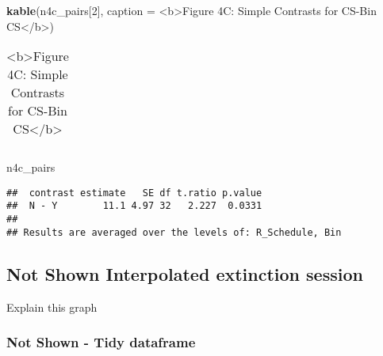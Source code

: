 \documentclass[
]{article}
\newenvironment{Shaded}{\begin{snugshade}}{\end{snugshade}}
\newcommand{\AttributeTok}[1]{\textcolor[rgb]{0.13,0.29,0.53}{#1}}
\newcommand{\DecValTok}[1]{\textcolor[rgb]{0.00,0.00,0.81}{#1}}
\newcommand{\FunctionTok}[1]{\textcolor[rgb]{0.13,0.29,0.53}{\textbf{#1}}}
\newcommand{\NormalTok}[1]{#1}
\newcommand{\StringTok}[1]{\textcolor[rgb]{0.31,0.60,0.02}{#1}}
\begin{document}
\begin{Shaded}
\begin{Highlighting}[]
\FunctionTok{kable}\NormalTok{(n4c\_pairs[}\DecValTok{2}\NormalTok{], }\AttributeTok{caption =} \StringTok{\textquotesingle{}\textless{}b\textgreater{}Figure 4C: Simple Contrasts for CS{-}Bin CS\textless{}/b\textgreater{}\textquotesingle{}}\NormalTok{)}
\end{Highlighting}
\end{Shaded}

\begin{table}
\caption{\label{tab:unnamed-chunk-8}<b>Figure 4C: Simple Contrasts for CS-Bin CS</b>}

\centering
\begin{tabular}[t]{}
\hline

\hline
\end{tabular}
\end{table}

\begin{Shaded}
\begin{Highlighting}[]
\NormalTok{n4c\_pairs}
\end{Highlighting}
\end{Shaded}

\begin{verbatim}
##  contrast estimate   SE df t.ratio p.value
##  N - Y        11.1 4.97 32   2.227  0.0331
## 
## Results are averaged over the levels of: R_Schedule, Bin
\end{verbatim}

\hypertarget{not-shown-interpolated-extinction-session}{%
\subsection{Not Shown Interpolated extinction
session}\label{not-shown-interpolated-extinction-session}}

Explain this graph

\hypertarget{not-shown---tidy-dataframe}{%
\subsubsection{Not Shown - Tidy
dataframe}\label{not-shown---tidy-dataframe}}
\end{document}
